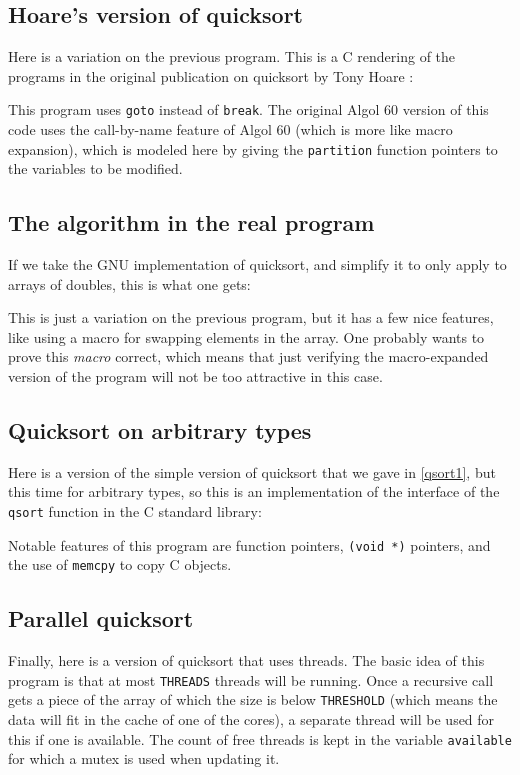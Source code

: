 \documentclass{article}
\begin{document}
\subsection{Hoare's version of quicksort}
Here is a variation on the previous program.
This is a C rendering of the programs in the original publication on
quicksort by Tony Hoare
\cite{hoa:61}:

This program uses \lstinline{goto} instead of \lstinline{break}.
The original Algol 60 version of this code uses the call-by-name feature of Algol 60 (which is
more like macro expansion),
which is modeled here by giving the \lstinline{partition} function pointers
to the variables to be modified.

\subsection{The algorithm in the real program}
If we take the GNU implementation of quicksort, and simplify it to
only apply to arrays of doubles, this is what one gets:

This is just a variation on the previous program, but it has
a few nice features, like using a macro for swapping elements in the array.
One probably wants to prove this \emph{macro} correct,
which means that just verifying the macro-expanded version of the
program will not be too attractive in this case.

\subsection{Quicksort on arbitrary types}
Here is a version of the simple version of quicksort that
we gave in \ref{qsort1}, but this time for arbitrary types, so this is an
implementation of the interface of the \lstinline{qsort} function in the C standard library:

Notable features of this program are function pointers,
\lstinline|(void *)| pointers, and the use of \lstinline|memcpy| to
copy C objects.

\subsection{Parallel quicksort}
Finally, here is a version of quicksort that uses threads.
The basic idea of this program is that at most \lstinline|THREADS| threads will be
running.
Once a recursive call gets a piece of the array of which the size is
below \lstinline|THRESHOLD| (which
means the data will fit in the cache of one of the cores), a separate
thread will be used for this if one is available.
The count of free threads is kept in the variable \lstinline|available|
for which a mutex is used when updating it.
\end{document}

